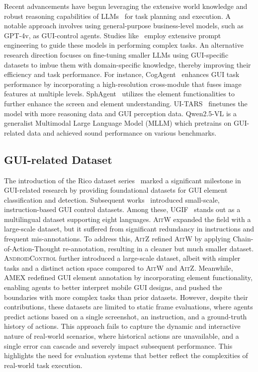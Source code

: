\documentclass[11pt]{article}
\begin{document}
Recent advancements have begun leveraging the extensive world knowledge and robust reasoning capabilities of LLMs~\citep{gu2024mamba, gur-etal-2023-understanding, touvron2023llama} for task planning and execution. A notable approach involves using general-purpose business-level models, such as GPT-4v, as GUI-control agents. Studies like~\citep{yang2023appagent, pmlr-v235-zheng24e} employ extensive prompt engineering to guide these models in performing complex tasks. An alternative research direction focuses on fine-tuning smaller LLMs using GUI-specific datasets to imbue them with domain-specific knowledge, thereby improving their efficiency and task performance. For instance, CogAgent~\citep{hong2024cogagent} enhances GUI task performance by incorporating a high-resolution cross-module that fuses image features at multiple levels. SphAgent~\citep{chai2024amex} utilizes the element functionalities to further enhance the screen and element understanding. UI-TARS~\citep{qin2025ui-tars} finetunes the model with more reasoning data and GUI perception data. Qwen2.5-VL is a generalist Multimodal Large Language Model (MLLM) which pretrains on GUI-related data and achieved sound performance on various benchmarks.

\subsection{GUI-related Dataset}

The introduction of the Rico dataset series~\citep{Deka:2017:Rico, sunkara-etal-2022-towards} marked a significant milestone in GUI-related research by providing foundational datasets for GUI element classification and detection. Subsequent works~\citep{burns2021motif, gubbi-venkatesh-etal-2024-ugif} introduced small-scale, instruction-based GUI control datasets. Among these, UGIF~\citep{gubbi-venkatesh-etal-2024-ugif} stands out as a multilingual dataset supporting eight languages. \textsc{AitW}\citep{rawles2024androidinthewild} expanded the field with a large-scale dataset, but it suffered from significant redundancy in instructions and frequent mis-annotations. To address this, \textsc{AitZ}\citep{zhang-etal-2024-aitz} refined \textsc{AitW} by applying Chain-of-Action-Thought re-annotation, resulting in a cleaner but much smaller dataset. \textsc{AndroidControl}\citep{li2024androidcontrol} further introduced a large-scale dataset, albeit with simpler tasks and a distinct action space compared to \textsc{AitW} and \textsc{AitZ}. Meanwhile, AMEX\citep{chai2024amex} redefined GUI element annotation by incorporating element functionality, enabling agents to better interpret mobile GUI designs, and pushed the boundaries with more complex tasks than prior datasets. However, despite their contributions, these datasets are limited to static frame evaluations, where agents predict actions based on a single screenshot, an instruction, and a ground-truth history of actions. This approach fails to capture the dynamic and interactive nature of real-world scenarios, where historical actions are unavailable, and a single error can cascade and severely impact subsequent performance. This highlights the need for evaluation systems that better reflect the complexities of real-world task execution.
\end{document}
